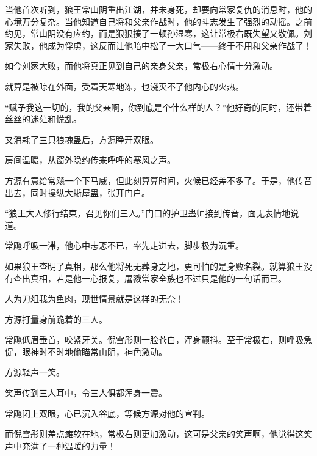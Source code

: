 \begin{this_body}
当他首次听到，狼王常山阴重出江湖，并未身死，却要向常家复仇的消息时，他的心境万分复杂。当他知道自己将和父亲作战时，他的斗志发生了强烈的动摇。之前约见，常山阴没有应约，而是狠狠揍了一顿孙湿寒，这让常极右既失望又敬佩。刘家失败，他成为俘虏，这反而让他暗中松了一大口气——终于不用和父亲作战了！

如今刘家大败，而他将真正见到自己的亲身父亲，常极右心情十分激动。

就算是被晾在外面，受着天寒地冻，也浇灭不了他内心的火热。

“赋予我这一切的，我的父亲啊，你到底是个什么样的人？”他好奇的同时，还带着丝丝的迷茫和慌乱。

又消耗了三只狼魂蛊后，方源睁开双眼。

房间温暖，从窗外隐约传来呼呼的寒风之声。

方源有意给常飚一个下马威，但此刻算算时间，火候已经差不多了。于是，他传音出去，同时操纵大蜥屋蛊，张开门户。

“狼王大人修行结束，召见你们三人。”门口的护卫蛊师接到传音，面无表情地说道。

常飚呼吸一滞，他心中忐忑不已，率先走进去，脚步极为沉重。

如果狼王查明了真相，那么他将死无葬身之地，更可怕的是身败名裂。就算狼王没有查出真相，若是他一心报复，屠戮常家全族也不过只是他的一句话而已。

人为刀俎我为鱼肉，现世情景就是这样的无奈！

方源打量身前跪着的三人。

常飚低眉垂首，咬紧牙关。倪雪彤则一脸苍白，浑身颤抖。至于常极右，则呼吸急促，眼神时不时地偷瞄常山阴，神色激动。

方源轻声一笑。

笑声传到三人耳中，令三人俱都浑身一震。

常飚闭上双眼，心已沉入谷底，等候方源对他的宣判。

而倪雪彤则差点瘫软在地，常极右则更加激动，这可是父亲的笑声啊，他觉得这笑声中充满了一种温暖的力量！

\end{this_body}


